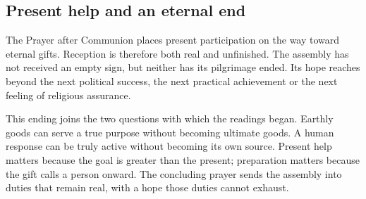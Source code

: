 \subsection{Present help and an eternal end}
The Prayer after Communion places present participation on the way toward eternal gifts. Reception is therefore both real and unfinished. The assembly has not received an empty sign, but neither has its pilgrimage ended. Its hope reaches beyond the next political success, the next practical achievement or the next feeling of religious assurance.

This ending joins the two questions with which the readings began. Earthly goods can serve a true purpose without becoming ultimate goods. A human response can be truly active without becoming its own source. Present help matters because the goal is greater than the present; preparation matters because the gift calls a person onward. The concluding prayer sends the assembly into duties that remain real, with a hope those duties cannot exhaust.
